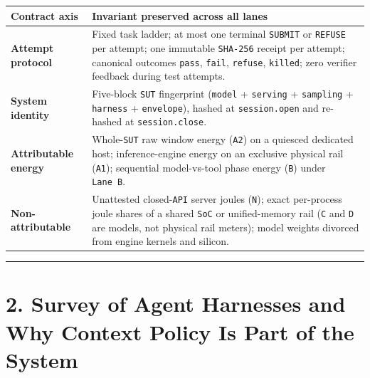 \documentclass[10pt,letterpaper]{article}
\begin{document}
{\footnotesize\setlength{\tabcolsep}{3.8pt}\renewcommand{\arraystretch}{1.15}
\begin{longtable}[]{@{}
  >{\raggedright\arraybackslash}p{}
  >{\raggedright\arraybackslash}p{}@{}}
\toprule\noalign{}
\begin{minipage}[b]{\linewidth}\raggedright
\textbf{Contract axis}
\end{minipage} & \begin{minipage}[b]{\linewidth}\raggedright
\textbf{Invariant preserved across all lanes}
\end{minipage} \\
\midrule\noalign{}
\endhead
\bottomrule\noalign{}
\endlastfoot
\textbf{Attempt protocol} & Fixed task ladder; at most one terminal
\texttt{SUBMIT} or \texttt{REFUSE} per attempt; one immutable
\texttt{SHA-256} receipt per attempt; canonical outcomes \texttt{pass},
\texttt{fail}, \texttt{refuse}, \texttt{killed}; zero verifier feedback
during test attempts. \\
\textbf{System identity} & Five-block \texttt{SUT} fingerprint
(\texttt{model} + \texttt{serving} + \texttt{sampling} +
\texttt{harness} + \texttt{envelope}), hashed at \texttt{session.\allowbreak{}open}
and re-hashed at \texttt{session.\allowbreak{}close}. \\
\textbf{Attributable energy} & Whole-\texttt{SUT} raw window energy
(\texttt{A2}) on a quiesced dedicated host; inference-engine energy on
an exclusive physical rail (\texttt{A1}); sequential model-vs-tool phase
energy (\texttt{B}) under \texttt{Lane\ B}. \\
\textbf{Non-attributable} & Unattested closed-\texttt{API} server joules
(\texttt{N}); exact per-process joule shares of a shared \texttt{SoC} or
unified-memory rail (\texttt{C} and \texttt{D} are models, not physical
rail meters); model weights divorced from engine kernels and silicon. \\
\end{longtable}
}

\begin{center}\rule{0.5\linewidth}{0.5pt}\end{center}

\section{2. Survey of Agent Harnesses and Why Context Policy Is Part of
the
System}\label{survey-of-agent-harnesses-and-why-context-policy-is-part-of-the-system}
\end{document}
